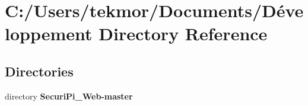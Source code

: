 \section{C\+:/\+Users/tekmor/\+Documents/\+Développement Directory Reference}
\label{dir_34c0f86e3b94b1fd6f45d5cde5f9bd11}
\subsection*{Directories}
\begin{DoxyCompactItemize}
\item 
directory {\bf Securi\+Pi\+\_\+\+Web-\/master}
\end{DoxyCompactItemize}
